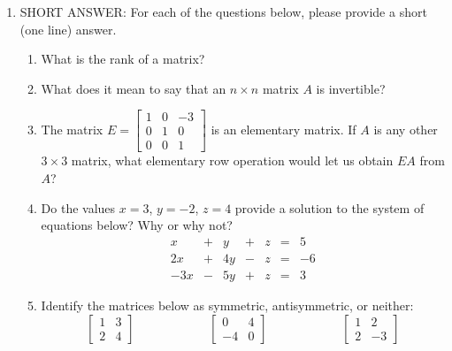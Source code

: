 \documentclass[12pt]{article}
\newcommand{\points}[1]{\marginpar{\hspace{24pt}[#1]}}
\begin{document}
\begin{enumerate}
\item SHORT ANSWER: For each of the questions below, please provide a short (one line) answer.
 \begin{enumerate}
\item What is the rank of a matrix? \points{2}

\vspace{1in}

\item What does it mean to say that an $n\times n$ matrix $A$ is invertible? \points{2}

\vspace{1in}

\item The matrix $E=\begin{bmatrix}
1&0&-3\\0&1&0\\0&0&1
\end{bmatrix}$ is an elementary matrix. If $A$ is any other $3\times 3$ matrix, what elementary row operation would let us obtain $EA$ from $A$? \points{2}

\vspace{1in}

\item Do the values $x=3$, $y=-2$, $z=4$ provide a solution to the system of equations below? Why or why not?\points{2}
\[
\begin{array}{ccccccc}
x&+&y&+&z&=&5\\
2x&+&4y&-&z&=&-6\\
-3x&-&5y&+&z&=&3
\end{array}
\]

\vspace{1in}

\item Identify the matrices below as symmetric, antisymmetric, or neither: \points{2}
\[
\begin{bmatrix}
1&3\\2&4
\end{bmatrix}\hspace{1in} \begin{bmatrix}
0&4\\-4&0
\end{bmatrix}\hspace{1in} \begin{bmatrix}
1&2\\2&-3
\end{bmatrix}
\]
\end{enumerate}
\newpage


\end{enumerate}
\end{document}
